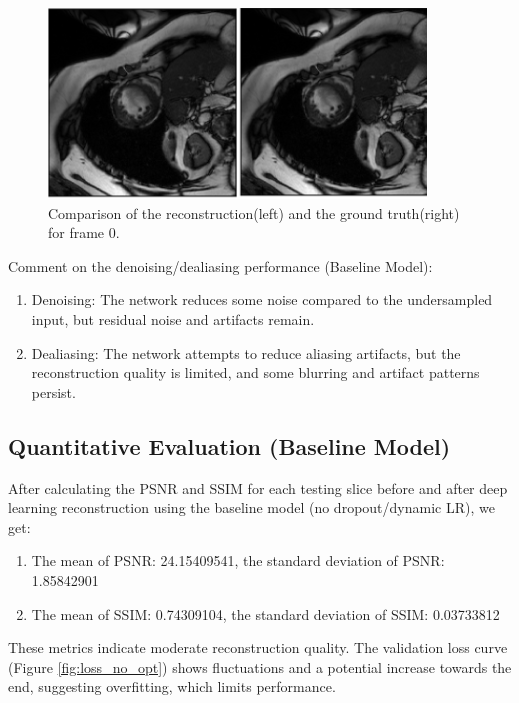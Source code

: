 \documentclass{article}
\begin{document}
\begin{figure}[H]
  \centering
  \includegraphics[width=0.8\linewidth]{../images/compare.PNG}
  \caption{Comparison of the reconstruction(left) and the ground truth(right) for frame 0.}
  \label{fig:compare}
\end{figure}

Comment on the denoising/dealiasing performance (Baseline Model):
\begin{enumerate}
  \item Denoising: The network reduces some noise compared to the undersampled input, but residual noise and artifacts remain.
  \item Dealiasing: The network attempts to reduce aliasing artifacts, but the reconstruction quality is limited, and some blurring and artifact patterns persist.
\end{enumerate}

\subsection{Quantitative Evaluation (Baseline Model)}
After calculating the PSNR and SSIM for each testing slice before and after deep learning reconstruction using the baseline model (no dropout/dynamic LR), we get:
\begin{enumerate}
  \item The mean of PSNR: 24.15409541, the standard deviation of PSNR: 1.85842901
  \item The mean of SSIM: 0.74309104, the standard deviation of SSIM: 0.03733812
\end{enumerate}
These metrics indicate moderate reconstruction quality. The validation loss curve (Figure \ref{fig:loss_no_opt}) shows fluctuations and a potential increase towards the end, suggesting overfitting, which limits performance.
\end{document}
